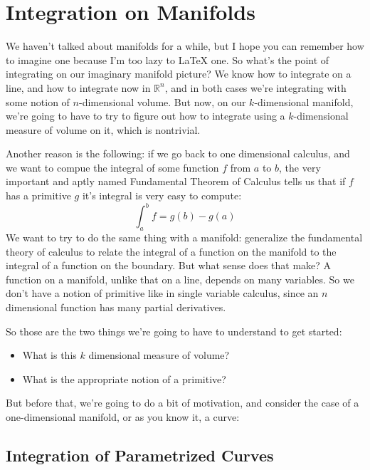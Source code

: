 \documentclass{article}
\newcommand{\reals}[0]{\mathbb{R}}
\begin{document}
\section{Integration on Manifolds}

We haven't talked about manifolds for a while, but I hope you can remember how to imagine one because I'm too lazy to {\LaTeX} one. So what's the point of integrating on our imaginary manifold picture? We know how to integrate on a line, and how to integrate now in \(\reals^n\), and in both cases we're integrating with some notion of \(n\)-dimensional volume. But now, on our \(k\)-dimensional manifold, we're going to have to try to figure out how to integrate using a \(k\)-dimensional measure of volume on it, which is nontrivial.

Another reason is the following: if we go back to one dimensional calculus, and we want to compue the integral of some function \(f\) from \(a\) to \(b\), the very important and aptly named Fundamental Theorem of Calculus tells us that if \(f\) has a primitive \(g\) it's integral is very easy to compute:
\begin{equation}
  \int_a^bf = g(b) - g(a)
\end{equation}
We want to try to do the same thing with a manifold: generalize the fundamental theory of calculus to relate the integral of a function on the manifold to the integral of a function on the boundary. But what sense does that make? A function on a manifold, unlike that on a line, depends on many variables. So we don't have a notion of primitive like in single variable calculus, since an \(n\) dimensional function has many partial derivatives.

So those are the two things we're going to have to understand to get started:
\begin{itemize}
  \item What is this \(k\) dimensional measure of volume?
  \item What is the appropriate notion of a primitive?
\end{itemize}
But before that, we're going to do a bit of motivation, and consider the case of a one-dimensional manifold, or as you know it, a curve:

\subsection{Integration of Parametrized Curves}
\end{document}
